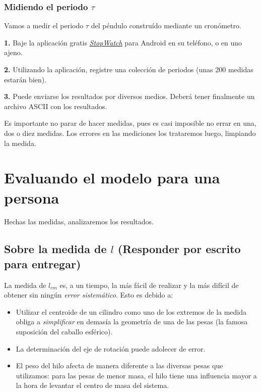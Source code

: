 \documentclass[10pt,a4paper]{article}
\numberwithin{equation}{section}%
\numberwithin{equation}{subsection}
\begin{document}
\subsubsection*{Midiendo el periodo $\tau$}

Vamos a medir el periodo $\tau$ del péndulo construído mediante un cronómetro. 

\noindent \textbf{1.} Baje la aplicación gratis \href{https://chrome.google.com/webstore/detail/stopwatch-timer/eoiibkbchfmgmhlodifjceiginokllbj}{\textit{StopWatch}} para Android en su teléfono, o en uno ajeno.

\noindent \textbf{2.} Utilizando la aplicación, registre una colección de periodos (unas 200 medidas estarán bien). 

\noindent \textbf{3.} Puede enviarse los resultados por diversos medios. Deberá tener finalmente un archivo ASCII con los resultados.

Es importante no parar de hacer medidas, pues es casi imposible no errar en una, dos o diez medidas. Los errores en las mediciones los trataremos luego, limpiando la medida.



\section{Evaluando el modelo para una persona}

Hechas las medidas, analizaremos los resultados.

\subsection{Sobre la medida de $l$ (Responder por escrito para entregar)}

La medida de $l_{cm}$ es, a un tiempo, la más fácil de realizar y la más difícil de obtener sin ningún \textit{error sistemático}. Esto es debido a:

\begin{itemize}
\item[$\bullet$] Utilizar el centroide de un cilindro como uno de los extremos de la medida obliga a \textit{simplificar} en demasía la geometría de una de las pesas (la famosa suposición del caballo esférico).
\item[$\bullet$] La determinación del eje de rotación puede adolecer de error.
\item[$\bullet$] El peso del hilo afecta de manera diferente a las diversas pesas que utilizamos: para las pesas de menor masa, el hilo tiene una influencia mayor a la hora de levantar el centro de masa del sistema. 
\end{itemize}
\end{document}
